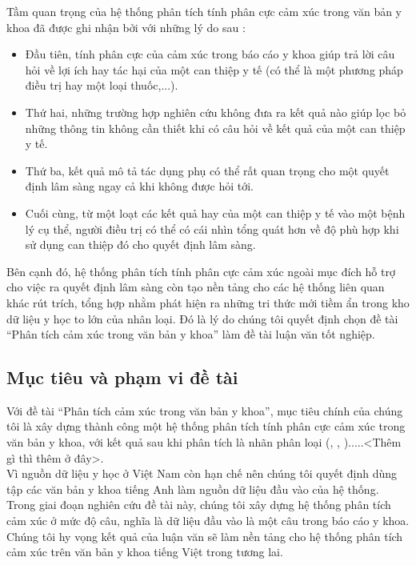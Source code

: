 Tầm quan trọng của hệ thống phân tích tính phân cực cảm xúc trong văn bản y khoa đã được ghi nhận bởi \cite{niu2005analysis} với những lý do sau : 
\begin{itemize}
\item Đầu tiên, tính phân cực của cảm xúc trong báo cáo y khoa giúp trả lời câu hỏi về lợi ích hay tác hại của một can thiệp y tế (có thể là một phương pháp điều trị hay một loại thuốc,...).
\item Thứ hai, những trường hợp nghiên cứu không đưa ra kết quả nào giúp lọc bỏ những thông tin không cần thiết khi có câu hỏi về kết quả của một can thiệp y tế.
\item Thứ ba, kết quả \tieucuc mô tả tác dụng phụ có thể rất quan trọng cho một quyết định lâm sàng ngay cả khi không được hỏi tới.
\item Cuối cùng, từ một loạt các kết quả \tichcuc hay \tieucuc của một can thiệp y tế vào một bệnh lý cụ thể, người điều trị có thể có cái nhìn tổng quát hơn về độ phù hợp khi sử dụng can thiệp đó cho quyết định lâm sàng.
\end{itemize}

Bên cạnh đó, hệ thống phân tích tính phân cực cảm xúc ngoài mục đích hỗ trợ cho việc ra quyết định lâm sàng còn tạo nền tảng cho các hệ thống liên quan khác rút trích, tổng hợp nhằm phát hiện ra những tri thức mới tiềm ẩn trong kho dữ liệu y học to lớn của nhân loại. Đó là lý do chúng tôi quyết định chọn đề tài ``Phân tích cảm xúc trong văn bản y khoa'' làm đề tài luận văn tốt nghiệp.

\subsection{Mục tiêu và phạm vi đề tài}
Với đề tài ``Phân tích cảm xúc trong văn bản y khoa'', mục tiêu chính của chúng tôi là xây dựng thành công một hệ thống phân tích tính phân cực cảm xúc trong văn bản y khoa, với kết quả sau khi phân tích là nhãn phân loại (\tichcuc, \tieucuc, \trungtinh).....<Thêm gì thì thêm ở đây>.\\

Vì nguồn dữ liệu y học ở Việt Nam còn hạn chế nên chúng tôi quyết định dùng tập các văn bản y khoa tiếng Anh làm nguồn dữ liệu đầu vào của hệ thống. Trong giai đoạn nghiên cứu đề tài này, chúng tôi xây dựng hệ thống phân tích cảm xúc ở mức độ câu, nghĩa là dữ liệu đầu vào là một câu trong báo cáo y khoa. Chúng tôi hy vọng kết quả của luận văn sẽ làm nền tảng cho hệ thống phân tích cảm xúc trên văn bản y khoa tiếng Việt trong tương lai.

